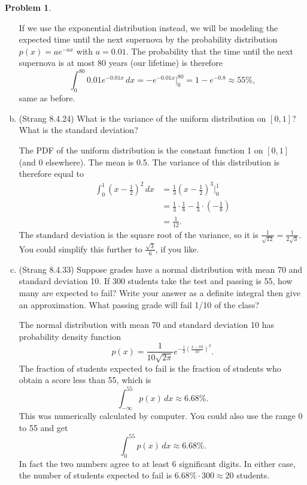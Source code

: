 \documentclass[11pt,oneside]{amsart}
\theoremstyle{definition}
\newtheorem{problem}{Problem}
\begin{document}
\begin{problem}
\begin{enumerate}[(a)]
\begin{solution}
                If we use the exponential distribution instead, we will be modeling the expected time until the next supernova by the probability distribution $p(x)=a e^{-ax}$ with $a=0.01$. The probability that the time until the next supernova is at most 80 years (our lifetime) is therefore
                \[\int_0^{80}0.01e^{-0.01x}\,dx=-e^{-0.01x}\big|_0^{80}=1-e^{-0.8}\approx 55\%,\]
                same as before.
            \end{solution}
            \item (Strang 8.4.24) What is the variance of the uniform distribution on $[0,1]$? What is the standard deviation?
            \begin{solution}
                The PDF of the uniform distribution is the constant function 1 on $[0,1]$ (and 0 elsewhere). The mean is 0.5. The variance of this distribution is therefore equal to
                \[\begin{split}
                    \int_0^1 \left(x-\frac12\right)^2\,dx &= \frac 13\left(x-\frac 12\right)^3\Big|_0^1\\
                    &= \frac 13\cdot\frac 18-\frac 13\cdot \left(-\frac18\right)\\
                    &= \frac 1{12}.
                \end{split}\]
                The standard deviation is the square root of the variance, so it is $\frac 1{\sqrt{12}}=\frac 1{2\sqrt 3}$. You could simplify this further to $\frac{\sqrt 3}6$, if you like.
            \end{solution}
            \item (Strang 8.4.33) Suppose grades have a normal distribution with mean 70 and standard deviation 10. If 300 students take the test and passing is 55, how many are expected to fail? Write your answer as a definite integral then give an approximation. What passing grade will fail 1/10 of the class?
            \begin{solution}
                The normal distribution with mean 70 and standard deviation 10 has probability density function
                \[p(x)=\frac 1{10\sqrt{2\pi}}e^{-\frac12\left(\frac{x-70}{10}\right)^2}.\]
                The fraction of students expected to fail is the fraction of students who obtain a score less than 55, which is
                \[\int_{-\infty}^{55}p(x)\,dx\approx 6.68\%.\]
                This was numerically calculated by computer. You could also use the range 0 to 55 and get
                \[\int_{0}^{55}p(x)\,dx\approx 6.68\%.\]
                In fact the two numbers agree to at least 6 significant digits. In either case, the number of students expected to fail is $6.68\%\cdot 300\approx 20$ students.


\end{solution}
\end{enumerate}
\end{problem}
\end{document}
